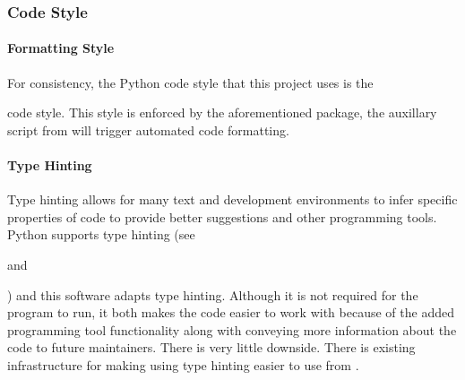 \documentclass[letterpaper,11pt,english]{sphinxmanual}
\begin{document}
\subsubsection{Code Style}
\label{\detokenize{technical/conventions:code-style}}

\paragraph{Formatting Style}
\label{\detokenize{technical/conventions:formatting-style}}
\sphinxAtStartPar
For consistency, the Python code style that this project uses is the
%
\begin{footnote}[61]\sphinxAtStartFootnote
{}
%
\end{footnote} code style. This style is enforced
by the aforementioned package, the auxillary script from
{\hyperref[\detokenize{technical/installation/index:technical-installation-automated-scripts}]{}} will trigger automated code
formatting.


\paragraph{Type Hinting}
\label{\detokenize{technical/conventions:type-hinting}}
\sphinxAtStartPar
Type hinting allows for many text and development environments to infer
specific properties of code to provide better suggestions and other
programming tools. Python supports type hinting (see %
\begin{footnote}[62]\sphinxAtStartFootnote
{}
%
\end{footnote} and %
\begin{footnote}[63]\sphinxAtStartFootnote
{}
%
\end{footnote})
and this software adapts type hinting. Although it is not required for the
program to run, it both makes the code easier to work with because of the
added programming tool functionality along with conveying more information
about the code to future maintainers. There is very little downside. There
is existing infrastructure for making using type hinting easier to use from
{\hyperref[\detokenize{technical/architecture/library:technical-architecture-library-hint}]{}}.
\end{document}
